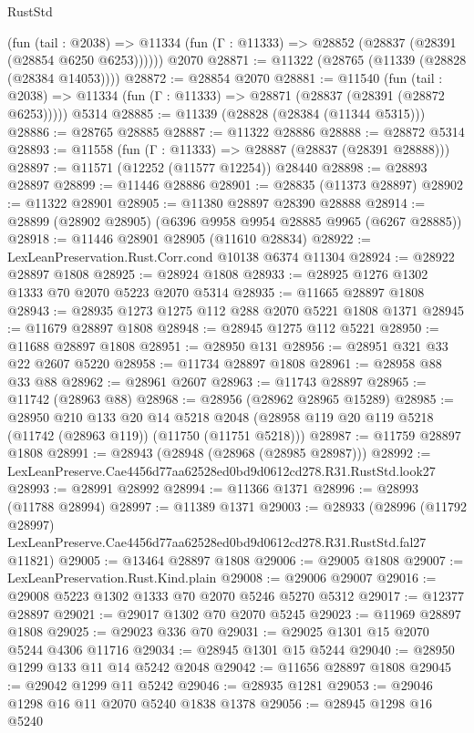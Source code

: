 \begin{lexlean}{RustStd}
\begin{coremodule}
      (fun (tail : @2038) =>
      @11334 (fun (Γ : @11333) => @28852 (@28837 (@28391 (@28854 @6250 @6253))))))
    @2070
@28871 := @11322 (@28765 (@11339 (@28828 (@28384 @14053))))
@28872 := @28854 @2070
@28881 := @11540
    (fun (tail : @2038) => @11334 (fun (Γ : @11333) => @28871 (@28837 (@28391 (@28872 @6253)))))
    @5314
@28885 := @11339 (@28828 (@28384 (@11344 @5315)))
@28886 := @28765 @28885
@28887 := @11322 @28886
@28888 := @28872 @5314
@28893 := @11558 (fun (Γ : @11333) => @28887 (@28837 (@28391 @28888)))
@28897 := @11571 (@12252 (@11577 @12254)) @28440
@28898 := @28893 @28897
@28899 := @11446 @28886
@28901 := @28835 (@11373 @28897)
@28902 := @11322 @28901
@28905 := @11380 @28897 @28390 @28888
@28914 := @28899 (@28902 @28905) (@6396 @9958 @9954 @28885 @9965 (@6267 @28885))
@28918 := @11446 @28901 @28905 (@11610 @28834)
@28922 := LexLeanPreservation.Rust.Corr.cond @10138 @6374 @11304
@28924 := @28922 @28897 @1808
@28925 := @28924 @1808
@28933 := @28925 @1276 @1302 @1333 @70 @2070 @5223 @2070 @5314
@28935 := @11665 @28897 @1808
@28943 := @28935 @1273 @1275 @112 @288 @2070 @5221 @1808 @1371
@28945 := @11679 @28897 @1808
@28948 := @28945 @1275 @112 @5221
@28950 := @11688 @28897 @1808
@28951 := @28950 @131
@28956 := @28951 @321 @33 @22 @2607 @5220
@28958 := @11734 @28897 @1808
@28961 := @28958 @88 @33 @88
@28962 := @28961 @2607
@28963 := @11743 @28897
@28965 := @11742 (@28963 @88)
@28968 := @28956 (@28962 @28965 @15289)
@28985 := @28950
    @210
    @133
    @20
    @14
    @5218
    @2048
    (@28958 @119 @20 @119 @5218 (@11742 (@28963 @119)) (@11750 (@11751 @5218)))
@28987 := @11759 @28897 @1808
@28991 := @28943 (@28948 (@28968 (@28985 @28987)))
@28992 := LexLeanPreserve.Cae4456d77aa62528ed0bd9d0612cd278.R31.RustStd.look27
@28993 := @28991 @28992
@28994 := @11366 @1371
@28996 := @28993 (@11788 @28994)
@28997 := @11389 @1371
@29003 := @28933
    (@28996
      (@11792 @28997)
      LexLeanPreserve.Cae4456d77aa62528ed0bd9d0612cd278.R31.RustStd.fal27
      @11821)
@29005 := @13464 @28897 @1808
@29006 := @29005 @1808
@29007 := LexLeanPreservation.Rust.Kind.plain
@29008 := @29006 @29007
@29016 := @29008 @5223 @1302 @1333 @70 @2070 @5246 @5270 @5312
@29017 := @12377 @28897
@29021 := @29017 @1302 @70 @2070 @5245
@29023 := @11969 @28897 @1808
@29025 := @29023 @336 @70
@29031 := @29025 @1301 @15 @2070 @5244 @4306 @11716
@29034 := @28945 @1301 @15 @5244
@29040 := @28950 @1299 @133 @11 @14 @5242 @2048
@29042 := @11656 @28897 @1808
@29045 := @29042 @1299 @11 @5242
@29046 := @28935 @1281
@29053 := @29046 @1298 @16 @11 @2070 @5240 @1838 @1378
@29056 := @28945 @1298 @16 @5240

\end{coremodule}
\end{lexlean}

